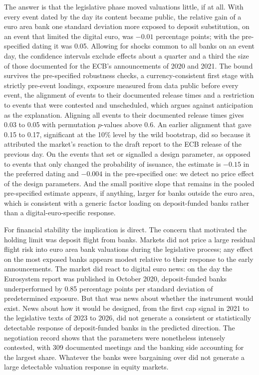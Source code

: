 \documentclass[11pt]{article}
\theoremstyle{plain}\newtheorem{proposition}{Proposition}
\begin{document}
The answer is that the legislative phase moved valuations little, if at all. With every event dated by the day its content became public, the relative gain of a euro area bank one standard deviation more exposed to deposit substitution, on an event that limited the digital euro, was $-0.01$ percentage points; with the pre-specified dating it was 0.05. Allowing for shocks common to all banks on an event day, the confidence intervals exclude effects about a quarter and a third the size of those documented for the ECB's announcements of 2020 and 2021. The bound survives the pre-specified robustness checks, a currency-consistent first stage with strictly pre-event loadings, exposure measured from data public before every event, the alignment of events to their documented release times and a restriction to events that were contested and unscheduled, which argues against anticipation as the explanation. Aligning all events to their documented release times gives 0.03 to 0.05 with permutation $p$-values above 0.6. An earlier alignment that gave 0.15 to 0.17, significant at the 10\% level by the wild bootstrap, did so because it attributed the market's reaction to the draft report to the ECB release of the previous day. On the events that set or signalled a design parameter, as opposed to events that only changed the probability of issuance, the estimate is $-0.15$ in the preferred dating and $-0.004$ in the pre-specified one: we detect no price effect of the design parameters. And the small positive slope that remains in the pooled pre-specified estimate appears, if anything, larger for banks outside the euro area, which is consistent with a generic factor loading on deposit-funded banks rather than a digital-euro-specific response.

For financial stability the implication is direct. The concern that motivated the holding limit was deposit flight from banks. Markets did not price a large residual flight risk into euro area bank valuations during the legislative process; any effect on the most exposed banks appears modest relative to their response to the early announcements. The market did react to digital euro news: on the day the Eurosystem report was published in October 2020, deposit-funded banks underperformed by 0.85 percentage points per standard deviation of predetermined exposure. But that was news about whether the instrument would exist. News about how it would be designed, from the first cap signal in 2021 to the legislative texts of 2023 to 2026, did not generate a consistent or statistically detectable response of deposit-funded banks in the predicted direction. The negotiation record shows that the parameters were nonetheless intensely contested, with 309 documented meetings and the banking side accounting for the largest share. Whatever the banks were bargaining over did not generate a large detectable valuation response in equity markets.
\end{document}
